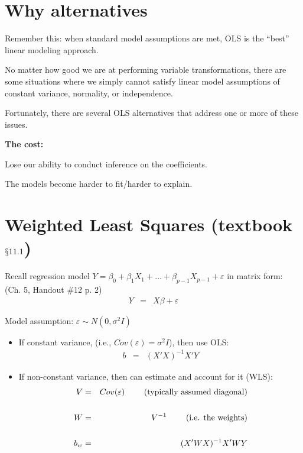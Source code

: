 \documentclass[12pt]{notes}
\begin{document}

\section{Why alternatives}
Remember this: when standard model assumptions are met, OLS is the ``best'' linear modeling approach. 

No matter how good we are at performing variable transformations, there are some situations where we simply cannot satisfy linear model assumptions of constant variance, normality, or independence. 

\nspace
Fortunately, there are several OLS alternatives that address one or more of these issues. 

\nspace
\textbf{The cost:} 
\bi
\item Lose our ability to conduct inference on the coefficients. 
\item The models become harder to fit/harder to explain. 
\ei

\section{Weighted Least Squares (textbook $\mathsection{11.1}$)}

\vspace{1em}

Recall regression model $Y = \beta_0 + \beta_1 X_1 + \ldots + \beta_{p-1}X_{p-1} + \varepsilon$ in matrix form:\\ (Ch. 5, Handout \#12 p. 2)
\begin{eqnarray}
  Y & = & X \beta + \varepsilon \nonumber
\end{eqnarray}

\vspace{2em}

Model assumption: $\varepsilon \sim N(0,\sigma^2 I)$

\begin{itemize}
  \item If constant variance, (i.e., $Cov(\varepsilon) = \sigma^2 I$), then use OLS:  
    \begin{eqnarray}
     b & = & (X' X)^{-1} X' Y \nonumber
    \end{eqnarray}
  \item If non-constant variance, then can estimate and account for it (WLS):
    \begin{eqnarray}
      V & = & Cov(\varepsilon)  \mbox{\hspace{2em} (typically assumed diagonal)}\nonumber \\
        &   & \nonumber \\
      W & = & V^{-1} \nonumber \mbox{\hspace{2em} (i.e. the weights)}\\
        &   & \nonumber \\
      b_w & = & (X' W X)^{-1} X' W Y \nonumber
    \end{eqnarray}
\end{itemize}
\end{document}
